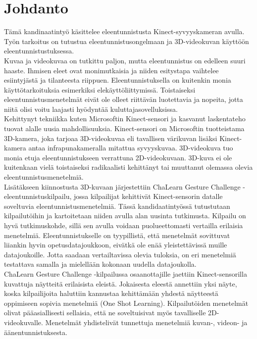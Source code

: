 
\section{Johdanto}

Tämä kandinaatintyö käsittelee eleentunnistusta Kinect-syvyyskameran avulla. 
Työn tarkoitus on tutustua eleentunnistusongelmaan ja 3D-videokuvan käyttöön eleentunnistustuksessa. \\

Kuvaa ja videokuvaa on tutkittu paljon, mutta eleentunnistus on edelleen suuri haaste. Ihmisen eleet
ovat monimutkaisia ja niiden esitystapa vaihtelee esiintyjästä ja tilanteesta riippuen. Eleentunnistuksella
on kuitenkin monia käyttötarkoituksia esimerkiksi elekäyttöliittymissä. \citep{chalearn2} Toistaiseksi
eleentunnistusmenetelmät eivät ole olleet riittävän luotettavia ja nopeita, jotta niitä olisi voitu
laajasti hyödyntää kuluttajasovelluksissa.\\

Kehittynyt tekniikka kuten Microsoftin Kinect-sensori ja kasvanut laskentateho tuovat alalle uusia mahdollisuuksia. 
Kinect-sensori on Microsoftin tuotteistama 3D-kamera, joka tarjoaa 3D-videokuvaa eli tavallisen värikuvan 
lisäksi Kinect-kamera antaa infrapunakameralla mitattua syvyyskuvaa. \citep{kinectkuva}
3D-videokuva tuo monia etuja eleentunnistukseen verrattuna 2D-videokuvaan. 3D-kuva ei ole kuitenkaan 
vielä toistaiseksi radikaalisti kehittänyt tai muuttanut olemassa olevia eleentunnistusmenetelmiä.\\

Lisätäkseen kiinnostusta 3D-kuvaan järjestettiin ChaLearn Gesture Challenge -eleentunnistuskilpailu, 
jossa kilpailijat kehittivät Kinect-sensorin datalle soveltuvia 
eleentunnistusmenetelmiä. Tässä kandidaatintyössä tutustutaan kilpailutöihin ja kartoitetaan niiden avulla alan uusinta tutkimusta. Kilpailu on hyvä tutkimuskohde,
sillä sen avulla voidaan puolueettomasti vertailla erilaisia menetelmiä. Eleentunnistukselle on tyypillistä, 
että menetelmät sovittuvat liiankin hyvin opetusdatajoukkoon, eivätkä ole enää yleistettävissä muille datajoukoille.
Jotta saadaan vertailtavissa olevia tuloksia, on eri menetelmiä testattava samalla ja mielellään kokonaan uudella datajoukolla.\\

ChaLearn Gesture Challenge -kilpailussa osaanottajille jaettiin Kinect-sensorilla kuvattuja näytteitä erilaisista eleistä.
Jokaisesta eleestä annettiin yksi näyte, koska kilpailijoita haluttiin kannustaa kehittämään yhdestä 
näytteestä oppimiseen sopivia menetelmiä (One Shot Learning). Kilpailutöiden menetelmät olivat pääasiallisesti sellaisia,
että ne soveltuisivat myös tavalliselle 2D-videokuvalle. Menetelmät yhdistelivät tunnettuja menetelmiä kuvan-, videon- ja äänentunnistuksesta.\\

